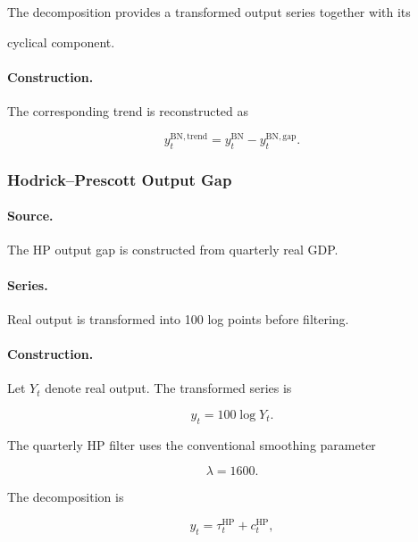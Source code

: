 \documentclass[11pt]{article}
\begin{document}
The decomposition provides a transformed output series together with its

cyclical component.

\paragraph{Construction.}

The corresponding trend is reconstructed as

\begin{equation}
y_t^{\mathrm{BN,trend}}
=
y_t^{\mathrm{BN}}
-
y_t^{\mathrm{BN,gap}}.
\end{equation}



\subsubsection{Hodrick--Prescott Output Gap}

\paragraph{Source.}

The HP output gap is constructed from quarterly real GDP.

\paragraph{Series.}

Real output is transformed into 100 log points before filtering.

\paragraph{Construction.}

Let $Y_t$ denote real output. The transformed series is

\begin{equation}
y_t
=
100\log Y_t.
\end{equation}

The quarterly HP filter uses the conventional smoothing parameter

\begin{equation}
\lambda=1600.
\end{equation}

The decomposition is

\begin{equation}
y_t
=
\tau_t^{\mathrm{HP}}
+
c_t^{\mathrm{HP}},
\end{equation}
\end{document}
